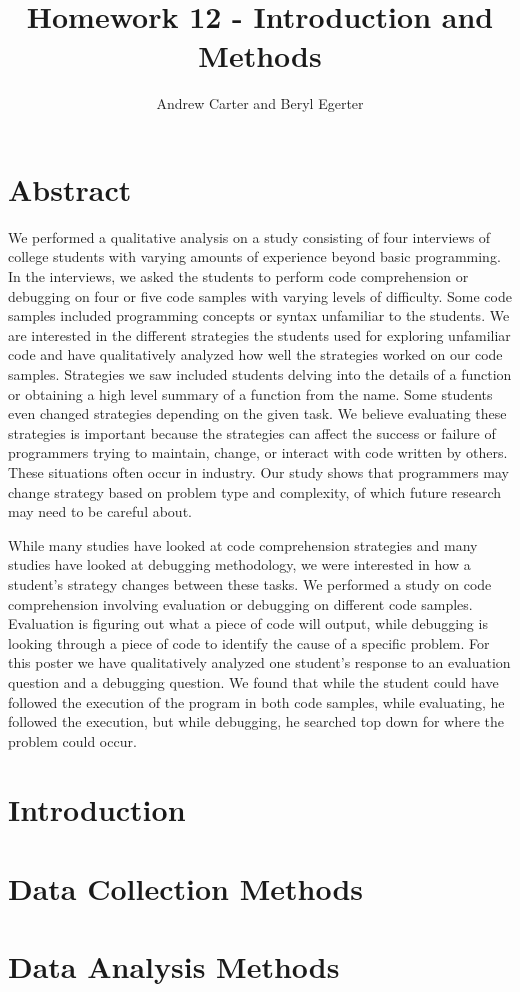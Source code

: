 \documentclass{article}
\title{Homework 12 - Introduction and Methods}
\author{Andrew Carter and Beryl Egerter}
\begin{document}
\maketitle
\section{Abstract}
We performed a qualitative analysis on a study consisting of four interviews of college students with varying amounts of experience beyond basic programming. In the interviews, we asked the students to perform code comprehension or debugging on four or five code samples with varying levels of difficulty. Some code samples included programming concepts or syntax unfamiliar to the students. We are interested in the different strategies the students used for exploring unfamiliar code and have qualitatively analyzed how well the strategies worked on our code samples. Strategies we saw included students delving into the details of a function or obtaining a high level summary of a function from the name. Some students even changed strategies depending on the given task. We believe evaluating these strategies is important because the strategies can affect the success or failure of programmers trying to maintain, change, or interact with code written by others. These situations often occur in industry. Our study shows that programmers may change strategy based on problem type and complexity, of which future research may need to be careful about.

While many studies have looked at code comprehension strategies and many studies have looked at debugging methodology, we were interested in how a student's strategy changes between these tasks. We performed a study on code comprehension involving evaluation or debugging on different code samples. Evaluation is figuring out what a piece of code will output, while debugging is looking through a piece of code to identify the cause of a specific problem. For this poster we have qualitatively analyzed one student's response to an evaluation question and a debugging question. We found that while the student could have followed the execution of the program in both code samples, while evaluating, he followed the execution, but while debugging, he searched top down for where the problem could occur.  

\section{Introduction}

\section{Data Collection Methods}

\section{Data Analysis Methods}
\end{document}
